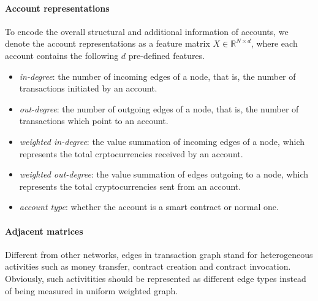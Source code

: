 

\paragraph{Account representations} To encode the overall structural and additional information of accounts, we denote the account representations as a feature matrix $X \in \mathbb{R}^{N \times d}$, where each account contains the following $d$ pre-defined features.

\begin{itemize}
	\item \emph{in-degree}: the number of incoming edges of a node, that is, the number of transactions initiated by an account.
	\item \emph{out-degree}: the number of outgoing edges of a node, that is, the number of transactions which point to an account.
	\item \emph{weighted in-degree}: the value summation of incoming edges of a node, which represents the total crptocurrencies received by an account.
	\item \emph{weighted out-degree}: the value summation of edges outgoing to a node, which represents the total cryptocurrencies sent from an account.
	\item \emph{account type}: whether the account is a smart contract or normal one.
\end{itemize}

\paragraph{Adjacent matrices} Different from other networks, edges in transaction graph stand for heterogeneous activities such as money transfer, contract creation and contract invocation. Obviously, such %
activitities should be represented as different edge types instead of being measured in uniform weighted graph.

